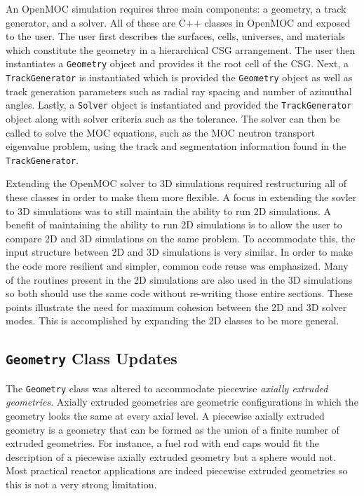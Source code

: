 An OpenMOC simulation requires three main components: a geometry, a track generator, and a solver. All of these are C++ classes in OpenMOC and exposed to the user. The user first describes the surfaces, cells, universes, and materials which constitute the geometry in a hierarchical \ac{CSG} arrangement. The user then instantiates a \texttt{Geometry} object and provides it the root cell of the \ac{CSG}. Next, a \texttt{TrackGenerator} is instantiated which is provided the \texttt{Geometry} object as well as track generation parameters such as radial ray spacing and number of azimuthal angles. Lastly, a \texttt{Solver} object is instantiated and provided the \texttt{TrackGenerator} object along with solver criteria such as the tolerance. The solver can then be called to solve the \ac{MOC} equations, such as the \ac{MOC} neutron transport eigenvalue problem, using the track and segmentation information found in the \texttt{TrackGenerator}.

Extending the OpenMOC solver to 3D simulations required restructuring all of these classes in order to make them more flexible. A focus in extending the sovler to 3D simulations was to still maintain the ability to run 2D simulations. A benefit of maintaining the ability to run 2D simulations is to allow the user to compare 2D and 3D simulations on the same problem. To accommodate this, the input structure between 2D and 3D simulations is very similar. In order to make the code more resilient and simpler, common code reuse was emphasized. Many of the routines present in the 2D simulations are also used in the 3D simulations so both should use the same code without re-writing those entire sections. These points illustrate the need for maximum cohesion between the 2D and 3D solver modes. This is accomplished by expanding the 2D classes to be more general.

\subsection{\texttt{Geometry} Class Updates}
\label{sec:oo-geometry}

The \texttt{Geometry} class was altered to accommodate piecewise \textit{axially extruded geometries}. Axially extruded geometries are geometric configurations in which the geometry looks the same at every axial level. A piecewise axially extruded geometry is a geometry that can be formed as the union of a finite number of extruded geometries. For instance, a fuel rod with end caps would fit the description of a piecewise axially extruded geometry but a sphere would not. Most practical reactor applications are indeed piecewise extruded geometries so this is not a very strong limitation. 

